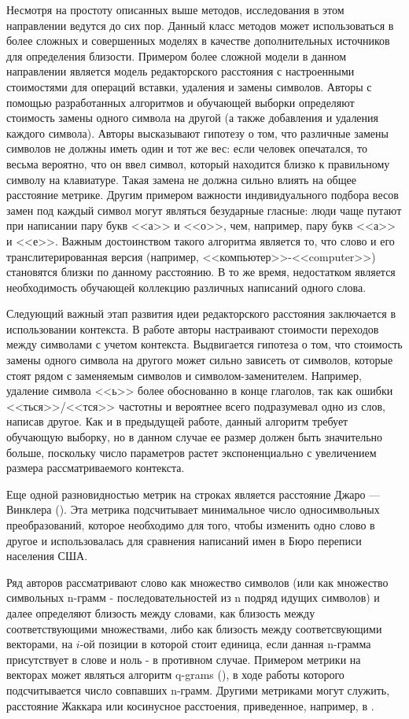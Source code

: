 Несмотря на простоту описанных выше методов, исследования в этом направлении ведутся до сих пор. Данный класс методов может использоваться в более сложных и совершенных моделях в качестве дополнительных источников для определения близости. Примером более сложной модели в данном направлении является модель редакторского расстояния с настроенными стоимостями для операций вставки, удаления и замены символов.
Авторы \cite{learn_leven} с помощью разработанных алгоритмов и обучающей выборки определяют стоимость замены одного символа на другой (а также добавления и удаления каждого символа). Авторы высказывают гипотезу о том, что различные замены символов не должны иметь один и тот же вес: если человек опечатался, то весьма вероятно, что он ввел символ, который находится близко к правильному символу на клавиатуре. Такая замена не должна сильно влиять на общее расстояние метрике. Другим примером важности индивидуального подбора весов замен под каждый символ могут являться безударные гласные: люди чаще путают при написании пару букв <<а>> и <<о>>, чем, например, пару букв <<а>> и <<е>>. Важным достоинством такого алгоритма является то, что слово и его транслитерированная версия (например, <<компьютер>>-<<computer>>) становятся близки по данному расстоянию. В то же время, недостатком является необходимость обучающей коллекцию различных написаний одного слова.

Следующий важный этап развития идеи редакторского расстояния заключается в использовании контекста. В работе \cite{context_leven} авторы настраивают стоимости переходов между символами с учетом контекста. Выдвигается гипотеза о том, что стоимость замены одного символа на другого может сильно зависеть от символов, которые стоят рядом с заменяемым символов и символом-заменителем. Например, удаление символа <<ь>> более обоснованно в конце глаголов, так как ошибки <<ться>>/<<тся>> частотны и вероятнее всего подразумевал одно из слов, написав другое. Как и в предыдущей работе, данный алгоритм требует обучающую выборку, но в данном случае ее размер должен быть значительно больше, поскольку число параметров растет экспоненциально с увеличением размера рассматриваемого контекста.

Еще одной разновидностью метрик на строках является расстояние Джаро — Винклера (\cite{jaro1,jaro2}). Эта метрика подсчитывает минимальное число односимвольных преобразований, которое необходимо для того, чтобы изменить одно слово в другое и использовалась для сравнения написаний имен в Бюро переписи населения США.

Ряд авторов рассматривают слово как множество символов (или как множество символьных n-грамм - последовательностей из n подряд идущих символов) и далее определяют близость между словами, как близость между соответствующими множествами, либо как близость между соответсвующими векторами, на $i$-ой позиции в которой стоит единица, если данная n-грамма присутствует в слове и ноль - в противном случае. Примером метрики на векторах может являться алгоритм q-grams (\cite{qgrams}), в ходе работы которого подсчитывается число совпавших n-грамм. Другими метриками могут служить,  расстояние Жаккара или косинусное расстоения, приведенное, например, в \cite{sim_metr}.

